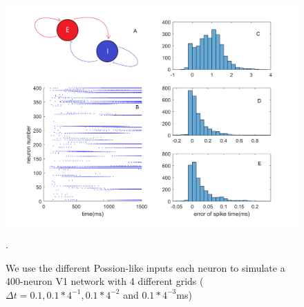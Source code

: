 \documentclass[10pt]{article}
\begin{document}
\begin{figure}[t] %
\includegraphics[width=\textwidth]{G_based_recurrent.pdf}
\caption{\color{Gray} We use the different Possion-like inputs each neuron to simulate a 400-neuron V1 network with 4 different grids ($\Delta t = 0.1,0.1*4^{-1},0.1*4^{-2}$ and $0.1*4^{-3}$ms)}.

\label{G_based_recurrent} %
\end{figure}
\end{document}
